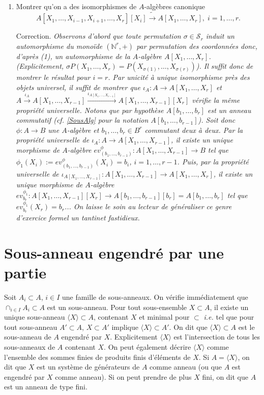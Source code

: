 \documentclass[a4paper, oneside, 12pt]{book}
\theoremstyle{definition} %
\newcommand{\ie}{\textit{i.e.}} %
\newcommand{\N}{\mathbb{N}}
\begin{document}
\begin{enumerate}[leftmargin=* ,parsep=0cm,itemsep=0cm,topsep=0cm]
\item Montrer qu'on a des isomorphismes de $A$-algèbres canonique $$  A[X_1,\dots,X_{i-1},X_{i+1},\dots, X_r][X_i]\tilde{\rightarrow} A[X_1,\dots,X_r],\; i=1,\dots, r.$$

   Correction. \textit{Observons d'abord que toute permutation $\sigma\in \mathcal{S}_r$ induit un automorphisme du monoïde $(\N^r,+)$ par permutation des coordonnées donc, d'après (1), un automorphisme de la $A$-algèbre $A[X_1,\dots, X_r]$. (Explicitement, $\sigma P(X_1,\dots, X_r)=P(X_{\sigma(1)},\dots, X_{\sigma(r)})$). Il suffit donc de montrer le résultat pour $i=r$. Par unicité  à unique isomorphisme près des objets universel, il suffit de montrer que 
$\iota_A:A\rightarrow A[X_1,\dots, X_r]$ et $A\stackrel{\iota_A}{\rightarrow} A[X_1,\dots, X_{r-1}]\stackrel{\iota_{A[X_1,\dots, X_{r-1}]}}{\rightarrow} A[X_1,\dots, X_{r-1}][X_r]$ vérifie la même propriété universelle. Notons que par hypothèse  $A[b_1,\dots ,b_r]$ est un anneau commutatif (\textit{cf.} \ref{SousAlg} pour la notation $A[b_1,\dots, b_{r-1}]$). Soit donc $\phi:A\rightarrow B$ une $A$-algèbre et $b_1,\dots, b_r\in B^r$ commutant deux à deux. Par la propriété universelle de $\iota_A:A\rightarrow A[X_1,\dots, X_{r-1}]$, il existe un unique morphisme de $A$-algèbre $ev_{(b_1,\dots, b_{r-1})}^\phi:A[X_1,\dots,X_{r-1}]\rightarrow B$ tel que $\phi_1(X_i):=ev_{(b_1,\dots, b_{r-1})}^\phi(X_i)=b_i$, $i=1,\dots, r-1$. Puis, par la propriété universelle de $\iota_{A[X_1,\dots, X_{r-1}]}:A[X_1,\dots, X_{r-1}]\rightarrow A[X_1,\dots, X_r]$, il existe un unique morphisme de $A$-algèbre $ev_{b_r}^{\phi_1}:A[X_1,\dots,X_{r-1}][X_r]\rightarrow A[b_1,\dots ,b_{r-1}][b_r]=A[b_1,\dots,b_r]$ tel que $ev_{b_r}^{\phi_1}(X_r)=b_r$... On laisse le soin au lecteur de généraliser ce genre d'exercice formel un tantinet fastidieux.} \\
 
  \end{enumerate}
 
 

 
  \section{Sous-anneau engendré par une partie} Soit  $A_i\subset A$, $i\in I$ une famille de sous-anneaux. On vérifie immédiatement que $\cap_{i\in I}A_i\subset A$ est un sous-anneau. Pour tout sous-ensemble $X\subset A$, il existe 
un unique sous-anneau $\langle X\rangle \subset A$, contenant $X$ et minimal pour $\subset$ \ie{} tel que pour  tout sous-anneau $A'\subset A$,   $X\subset A'$ implique  $\langle X\rangle\subset A'$. On dit que $\langle X\rangle\subset A$ est le sous-anneau de $A$ engendré par $X$.  Explicitement $\langle X\rangle$ est l'intersection de tous les sous-anneaux de $A$ contenant $X$. On peut également décrire $\langle X\rangle$ comme  l'ensemble des sommes finies de produits finis d'éléments de $X$. Si $A=\langle X\rangle$, on dit que $X$ est un système de générateurs de $A$ comme anneau (ou que $A$ est engendré par $X$ comme anneau). Si on peut prendre de plus $X$ fini, on dit que $A$ est un anneau de type fini.\\
\end{document}
